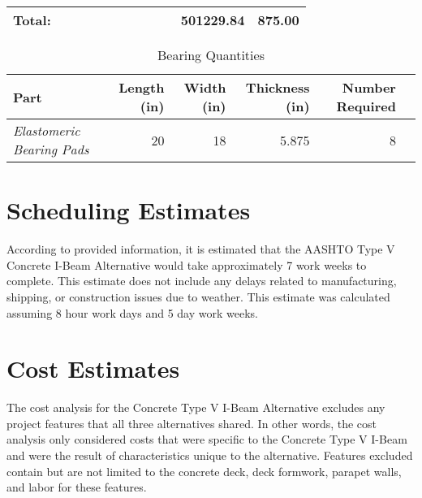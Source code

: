 \begin{table}[H]
{\begin{tabular}{p{4.4cm}rrrrrrrrrrr}
Total:                                                                     &                                    &                                 &                                     &                                        &                                        &                                        &                                      &                                  &                                      & 501229.84                               & 875.00                                          \\\bottomrule
\end{tabular}}
\end{table}



\begin{table}[H]
\centering
\caption{Bearing Quantities}\label{tab:babquant3}
\vspace{0.3cm}
\begin{tabular}{p{3.0cm}rrrrr}\toprule\midrule
\textbf{Part}                   & \textbf{Length (in)} & \textbf{Width (in)} & \textbf{Thickness (in)} & \textbf{Number Required}\\\midrule
\emph{Elastomeric Bearing Pads} & 20                   & 18                  & 5.875                   & 8 \\\bottomrule
\end{tabular}
\end{table}

\section{Scheduling Estimates}
According to provided information, it is estimated that the AASHTO Type V Concrete I-Beam Alternative would take approximately 7 work weeks to complete. This estimate does not include any delays related to manufacturing, shipping, or construction issues due to weather. This estimate was calculated assuming 8 hour work days and 5 day work weeks.


\section{Cost Estimates}

The cost analysis for the Concrete Type V I-Beam Alternative excludes any project features that all three alternatives shared. In other words, the cost analysis only considered costs that were specific to the Concrete Type V I-Beam and were the result of characteristics unique to the alternative. Features excluded contain but are not limited to the concrete deck, deck formwork, parapet walls, and labor for these features.

